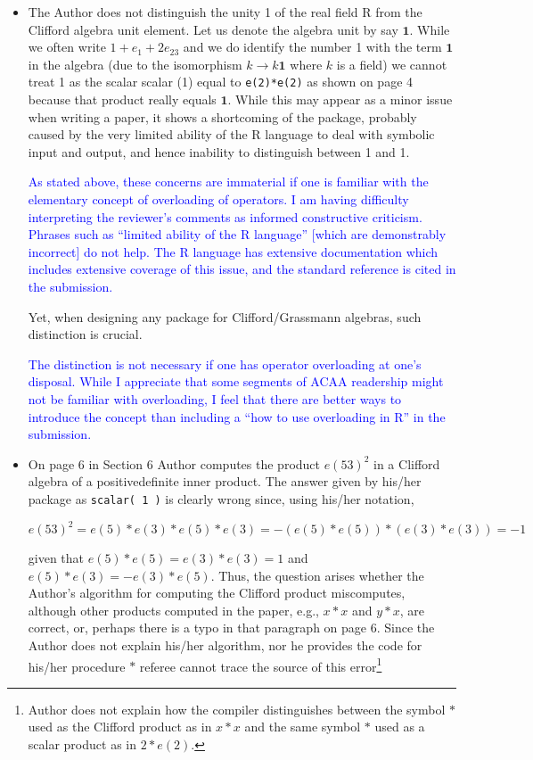 \documentclass{article}
\begin{document}
\begin{itemize}
\item The Author does not distinguish the unity 1 of the real field R
  from the Clifford algebra unit element. Let us denote the algebra
  unit by say $\mathbf{1}$. While we often write $1 + e_1 + 2e_{23}$
  and we do identify the number 1 with the term $\mathbf{1}$ in the
  algebra (due to the isomorphism $k\longrightarrow k\mathbf{1}$ where
  $k$ is a field) we cannot treat 1 as the scalar scalar (1) equal to
  \verb+e(2)*e(2)+ as shown on page 4 because that product really
  equals $\mathbf{1}$.  While this may appear as a minor issue when
  writing a paper, it shows a shortcoming of the package, probably
  caused by the very limited ability of the R language to deal with
  symbolic input and output, and hence inability to distinguish
  between 1 and 1.

  \textcolor{blue}{As stated above, these concerns are immaterial if
    one is familiar with the elementary concept of overloading of
    operators.  I am having difficulty interpreting the reviewer's
    comments as informed constructive criticism.  Phrases such as
    ``limited ability of the R language'' [which are demonstrably
      incorrect] do not help.  The R language has extensive
    documentation which includes extensive coverage of this issue, and
    the standard reference is cited in the submission.}

  Yet, when designing any package for Clifford/Grassmann algebras,
  such distinction is crucial.

  \textcolor{blue}{The distinction is not necessary if one has
    operator overloading at one's disposal.  While I appreciate that
    some segments of ACAA readership might not be familiar with
    overloading, I feel that there are better ways to introduce the
    concept than including a ``how to use overloading in R'' in the
    submission.}
  
\item On page 6 in Section 6 Author computes the product $e(53)^2$ in
  a Clifford algebra of a positivedefinite inner product. The answer
  given by his/her package as \verb+scalar( 1 )+ is clearly wrong
  since, using his/her notation,

  $$
  e(53)^2=e(5)*e(3)*e(5)*e(3)=-(e(5)*e(5))*(e(3)*e(3))=-1
  $$

given that $e(5)*e(5)=e(3)*e(3)=1$ and $e(5)*e(3)=-e(3)*e(5)$.  Thus,
the question arises whether the Author’s algorithm for computing the
Clifford product miscomputes, although other products computed in the
paper, e.g., $x * x$ and $y * x$, are correct, or, perhaps there is a
typo in that paragraph on page 6.  Since the Author does not explain
his/her algorithm, nor he provides the code for his/her procedure $*$
referee cannot trace the source of this error\footnote{Author does not
explain how the compiler distinguishes between the symbol $*$ used as
the Clifford product as in $x * x$ and the same symbol $*$ used as a
scalar product as in $2 * e(2)$.

}
\end{itemize}
\end{document}
